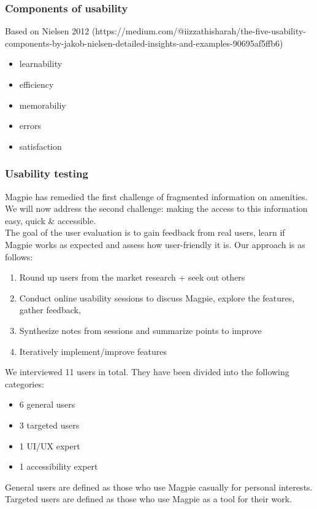 \subsubsection{Components of usability}
Based on Nielsen 2012 (https://medium.com/@iizzathisharah/the-five-usability-components-by-jakob-nielsen-detailed-insights-and-examples-90695af5ffb6)

\begin{itemize}
    \item learnability
    \item efficiency
    \item memorabiliy
    \item errors
    \item satisfaction
\end{itemize}

\newpage
\subsubsection{Usability testing}
Magpie has remedied the first challenge of fragmented information on amenities.\\
We will now address the second challenge: making the access to this information easy, quick \& accessible.\\

\noindent The goal of the user evaluation is to gain feedback from real users, learn if Magpie works as expected and assess how user-friendly it is. Our approach is as follows:
\begin{enumerate}
    \item Round up users from the market research + seek out others
    \item Conduct online usability sessions to discuss Magpie, explore the features, gather feedback,
    \item Synthesize notes from sessions and summarize points to improve
    \item Iteratively implement/improve features
\end{enumerate}
We interviewed 11 users in total. They have been divided into the following categories:
\begin{itemize}
    \item 6 general users
    \item 3 targeted users
    \item 1 UI/UX expert
    \item 1 accessibility expert
\end{itemize}
General users are defined as those who use Magpie casually for personal interests.\\
Targeted users are defined as those who use Magpie as a tool for their work.\\

